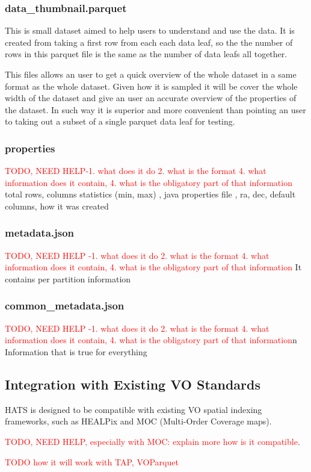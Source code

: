 \documentclass[11pt,a4paper]{ivoa}
\begin{document}
           \subsubsection{data\_thumbnail.parquet} 
  This is small dataset aimed to help users to understand and use the data. It is created from taking a first row from each each data leaf, so the the number of rows in this parquet file is the same as the number of  data leafs all together. \par
  This files allows an user to get a quick overview of the whole dataset in a same format as the whole dataset. Given how it is sampled it will be cover the whole width of the dataset and give an user an accurate overview of the properties of the dataset. In such way it is superior and more convenient than pointing an user to taking out a subset of a single parquet data leaf for testing. 
    
        \subsubsection{properties} 
   \textcolor{red}{TODO, NEED HELP-1. what does it do 2. what is the format 4. what information does it contain, 4. what is the obligatory part of that information}
     total rows, columns statistics (min, max) , java properties file , ra, dec, default columns, how it was created 
    
    
        \subsubsection{metadata.json} 
   \textcolor{red}{TODO, NEED HELP -1. what does it do 2. what is the format 4. what information does it contain, 4. what is the obligatory part of that information}
    It contains per partition information
        \subsubsection{common\_metadata.json} 
   \textcolor{red}{TODO, NEED HELP -1. what does it do 2. what is the format 4. what information does it contain, 4. what is the obligatory part of that information}n
    Information that is true for everything 

    \subsection{Integration with Existing VO Standards}
    HATS is designed to be compatible with existing VO spatial indexing frameworks, such as HEALPix and MOC (Multi-Order Coverage maps). \par
   \textcolor{red}{TODO, NEED HELP, especially with MOC: explain more how is it compatible}. \par 
   \textcolor{red}{ TODO how it will work with TAP, VOParquet}
\end{document}
